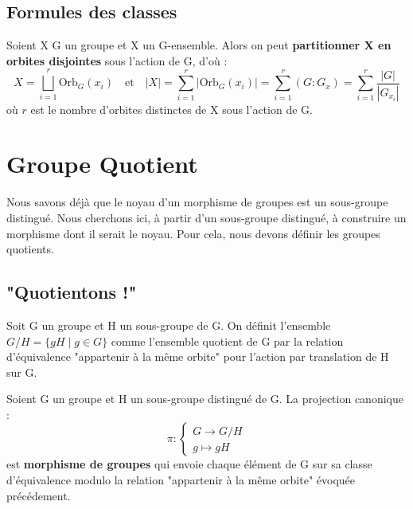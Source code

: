 \subsection{Formules des classes}

\begin{corollary}
	Soient X G un groupe et X un G-ensemble. Alors on peut \textbf{partitionner X en orbites disjointes} sous l'action de G, d'où :
	\[ X = \bigsqcup_{i=1}^r \text{Orb}_G(x_i) \quad \text{et} \quad |X| = \sum_{i=1}^{r} |\text{Orb}_G(x_i)| = \sum_{i=1}^{r} (G : G_x) = \sum_{i=1}^{r} \frac{ |G| }{ |G_{x_i}| } \]
	où $r$ est le nombre d'orbites distinctes de X sous l'action de G. 
\end{corollary}



\section{Groupe Quotient}

Nous savons déjà que le noyau d'un morphisme de groupes est un sous-groupe distingué. 
Nous cherchons ici, à partir d'un sous-groupe distingué, à construire un morphisme dont il serait le noyau. 
Pour cela, nous devons définir les groupes quotients. 

\subsection{"Quotientons !"}

Soit G un groupe et H un sous-groupe de G. On définit l'ensemble $G/H = \{gH \; | \; g \in G\}$ comme l'ensemble quotient de G par la relation d'équivalence "appartenir à la même orbite"
pour l'action par translation de H sur G. 

\begin{definition}
	Soient G un groupe et H un sous-groupe distingué de G. La projection canonique : 
	\[\pi : 
		\begin{cases}
			G \longrightarrow G/H \\ 
			g \longmapsto gH 
		\end{cases}
	\]
	est  \textbf{morphisme de groupes} qui envoie chaque élément de G sur sa classe d'équivalence modulo la relation "appartenir à la même orbite" évoquée précédement. 
\end{definition}

